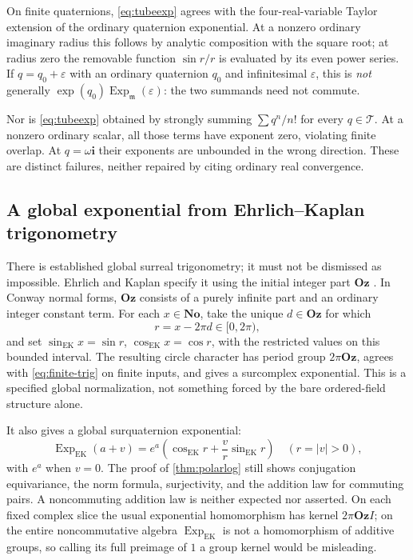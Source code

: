 \documentclass[11pt,letterpaper]{article}
\numberwithin{equation}{section}
\theoremstyle{definition}
\theoremstyle{remark}
\newcommand{\No}{\mathbf{No}}
\newcommand{\mm}{\mathfrak m}
\newcommand{\Oz}{\mathbf{Oz}}
\newcommand{\eps}{\varepsilon}
\newcommand{\ii}{\mathbf i}
\newcommand{\Exp}{\operatorname{Exp}}
\begin{document}
On finite quaternions, \eqref{eq:tubeexp} agrees with the four-real-variable Taylor extension
of the ordinary quaternion exponential. At a nonzero ordinary imaginary radius this follows
by analytic composition with the square root; at radius zero the removable function
$\sin r/r$ is evaluated by its even power series. If $q=q_0+\eps$ with an ordinary quaternion
$q_0$ and infinitesimal $\eps$, this is \emph{not} generally
$\exp(q_0)\Exp_{\mm}(\eps)$: the two summands need not commute.

Nor is \eqref{eq:tubeexp} obtained by strongly summing $\sum q^n/n!$ for every $q\in\mathcal T$.
At a nonzero ordinary scalar, all those terms have exponent zero, violating finite overlap.
At $q=\omega\ii$ their exponents are unbounded in the wrong direction. These are distinct
failures, neither repaired by citing ordinary real convergence.

\subsection{A global exponential from Ehrlich--Kaplan trigonometry}\label{sec:globalexp}
There is established global surreal trigonometry; it must not be dismissed as impossible.
Ehrlich and Kaplan specify it using the initial integer part $\Oz$ \cite[Section 11]{EK}.
In Conway normal forms, $\Oz$ consists of a purely infinite part and an ordinary integer
constant term. For each $x\in\No$, take the unique $d\in\Oz$ for which
\[
 r=x-2\pi d\in[0,2\pi),
\]
and set $\sin_{\mathrm{EK}}x=\sin r$, $\cos_{\mathrm{EK}}x=\cos r$, with the restricted
values on this bounded interval. The resulting circle character has period group
$2\pi\Oz$, agrees with \eqref{eq:finite-trig} on finite inputs, and gives a surcomplex
exponential. This is a specified global normalization, not something forced by the bare
ordered-field structure alone.

It also gives a global surquaternion exponential:
\begin{equation}\label{eq:globalexp}
 \Exp_{\mathrm{EK}}(a+v)
 =e^a\left(\cos_{\mathrm{EK}}r+\frac{v}{r}\sin_{\mathrm{EK}}r\right)
 \quad(r=|v|>0),
\end{equation}
with $e^a$ when $v=0$. The proof of \cref{thm:polarlog} still shows conjugation equivariance,
the norm formula, surjectivity, and the addition law for commuting pairs. A noncommuting
addition law is neither expected nor asserted. On each fixed complex slice the usual
exponential homomorphism has kernel $2\pi\Oz I$; on the entire noncommutative algebra
$\Exp_{\mathrm{EK}}$ is not a homomorphism of additive groups, so calling its full preimage
of $1$ a group kernel would be misleading.
\end{document}
